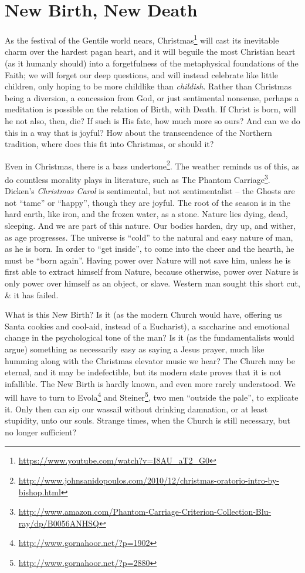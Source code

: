 \section{New Birth, New Death}

As the festival of the Gentile world nears, Christmas\footnote{\url{https://www.youtube.com/watch?v=I8AU\_aT2\_G0}} will cast its inevitable charm over the hardest pagan heart, and it will beguile the most Christian heart (as it humanly should) into a forgetfulness of the metaphysical foundations of the Faith; we will forget our deep questions, and will instead celebrate like little children, only hoping to be more childlike than \emph{childish}. Rather than Christmas being a diversion, a concession from God, or just sentimental nonsense, perhaps a meditation is possible on the relation of Birth, with Death. If Christ is born, will he not also, then, die? If such is His fate, how much more so ours? And can we do this in a way that is joyful? How about the transcendence of the Northern tradition, where does this fit into Christmas, or should it?

Even in Christmas, there is a bass undertone\footnote{\url{http://www.johnsanidopoulos.com/2010/12/christmas-oratorio-intro-by-bishop.html}}. The weather reminds us of this, as do countless morality plays in literature, such as The Phantom Carriage\footnote{\url{http://www.amazon.com/Phantom-Carriage-Criterion-Collection-Blu-ray/dp/B0056ANHSQ}}. Dicken's \emph{Christmas Carol} is sentimental, but not sentimentalist -- the Ghosts are not ``tame'' or ``happy'', though they are joyful. The root of the season is in the hard earth, like iron, and the frozen water, as a stone. Nature lies dying, dead, sleeping. And we are part of this nature. Our bodies harden, dry up, and wither, as age progresses. The universe is ``cold'' to the natural and easy nature of man, as he is born. In order to ``get inside'', to come into the cheer and the hearth, he must be ``born again''. Having power over Nature will not save him, unless he is first able to extract himself from Nature, because otherwise, power over Nature is only power over himself as an object, or slave. Western man sought this short cut, \& it has failed.

What is this New Birth? Is it (as the modern Church would have, offering us Santa cookies and cool-aid, instead of a Eucharist), a saccharine and emotional change in the psychological tone of the man? Is it (as the fundamentalists would argue) something as necessarily easy as saying a Jesus prayer, much like humming along with the Christmas elevator music we hear? The Church may be eternal, and it may be indefectible, but its modern state proves that it is not infallible. The New Birth is hardly known, and even more rarely understood. We will have to turn to Evola\footnote{\url{http://www.gornahoor.net/?p=1902}} and Steiner\footnote{\url{http://www.gornahoor.net/?p=2880}}, two men ``outside the pale'', to explicate it. Only then can sip our wassail without drinking damnation, or at least stupidity, unto our souls. Strange times, when the Church is still necessary, but no longer sufficient?

